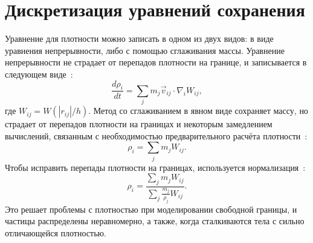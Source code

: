\section{Дискретизация уравнений сохранения}

Уравнение для плотности можно записать в одном из двух видов: в виде уравнения непрерывности, либо с помощью сглаживания массы.
%
Уравнение непрерывности не страдает от перепадов плотности на границе, и записывается в следующем виде~\cite{Monaghan1992}:
%
\begin{equation}\label{eq:continuity}
    \frac{d\rho_{i}}{dt} = \sum\limits_{j}m_{j}\vec{v}_{ij}\cdot\nabla_{i}W_{ij},
\end{equation}
%
где $W_{ij} = W(|r_{ij}|/h)$.
%
Метод со сглаживанием в явном виде сохраняет массу, но страдает от перепадов плотности на границах и некоторым замедлением вычислений,
связанным с необходимостью предварительного расчёта плотности~\cite{Kelager2006,Crespo2007,Liu2003}:
%
\begin{equation}\label{eq:sum_density}
    \rho_{i} = \sum\limits_{j} m_{j} W_{ij}.
\end{equation}
%
Чтобы исправить перепады плотности на границах, используется нормализация~\cite{Randles1996, Liu2010}:
%
\begin{equation}\label{eq:nor_density}
    \rho_{i} = \displaystyle\frac{\sum\limits_{j}m_{j}W_{ij}}{\sum\limits_{j}\frac{m_{j}}{\rho_{j}}W_{ij}}.
\end{equation}
%
Это решает проблемы с плотностью при моделировании свободной границы, и частицы распределены неравномерно, 
а также, когда сталкиваются тела с сильно отличающейся плотностью.

